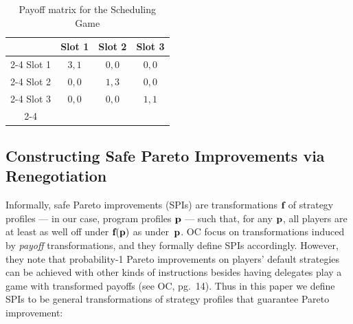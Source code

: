 \documentclass[sigconf]{aamas}
\theoremstyle{definition}
\begin{document}
\begin{table}
    \centering
    \caption{Payoff matrix for the Scheduling Game}
    \begin{tabular}{c|c|c|c|}
          \multicolumn{1}{c}{} & \multicolumn{1}{c}{Slot 1} & \multicolumn{1}{c}{ Slot 2} & \multicolumn{1}{c}{ Slot 3}\\
     \cline{2-4}
      Slot 1 & $3,1$ & $0, 0$ & $0, 0$ \\
        \cline{2-4}
       Slot 2 & $0,0$ & $1, 3$ & $0, 0$ \\
        \cline{2-4}
       Slot 3 & $0,0$ & $0, 0$ & $1, 1$ \\
       \cline{2-4}
    \end{tabular}
    \label{tab:meeting}
\end{table}

\subsection{Constructing
Safe Pareto Improvements via Renegotiation}
\label{sec:sub:pspi}

Informally, safe Pareto improvements (SPIs) \citep{oesterheld2021safe} are transformations $\textbf{f}$ of strategy profiles --- in our 
case, program profiles $\textbf{p}$ --- 
such that, for any $\textbf{p}$, all players are at least
as well off under $\textbf{f}(\textbf{p})$ as under~$\textbf{p}$. 
OC
focus on transformations induced by 
\textit{payoff} transformations,
and they formally 
define SPIs accordingly.
However, they note
that probability-1 Pareto improvements on 
players' 
default strategies can be achieved with other kinds of instructions
besides having 
delegates play a game with transformed payoffs (see OC, pg.~14).
Thus in this paper 
we define SPIs to be general transformations of 
strategy profiles that guarantee Pareto improvement:
\end{document}

